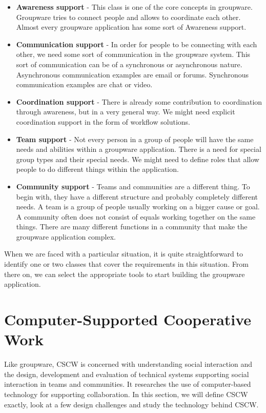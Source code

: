 \begin{itemize}
\item{\textbf{Awareness support} - This class is one of the core concepts in groupware. Groupware tries to connect people and allows to coordinate each other. Almost every groupware application has some sort of Awareness support.}
\item{\textbf{Communication support} - In order for people to be connecting with each other, we need some sort of communication in the groupware system. This sort of communication can be of a synchronous or asynchronous nature. Asynchronous communication examples are email or forums. Synchronous communication examples are chat or video.}
\item{\textbf{Coordination support} - There is already some contribution to coordination through awareness, but in a very general way. We might need explicit coordination support in the form of workflow solutions.}
\item{\textbf{Team support} - Not every person in a group of people will have the same needs and abilities within a groupware application. There is a need for special group types and their special needs. We might need to define roles that allow people to do different things within the application.}
\item{\textbf{Community support} - Teams and communities are a different thing. To begin with, they have a different structure and probably completely different needs. A team is a group of people usually working on a bigger cause or goal. A community often does not consist of equals working together on the same things. There are many different functions in a community that make the groupware application complex.}
\end{itemize}

When we are faced with a particular situation, it is quite straightforward to identify one or two classes that cover the requirements in this situation. From there on, we can select the appropriate tools to start building the groupware application.

\section{Computer-Supported Cooperative Work}

Like groupware, CSCW is concerned with understanding social interaction and the design, development and evaluation of technical systems supporting social interaction in teams and communities. It researches the use of computer-based technology for supporting collaboration. In this section, we will define CSCW exactly, look at a few design challenges and study the technology behind CSCW.

